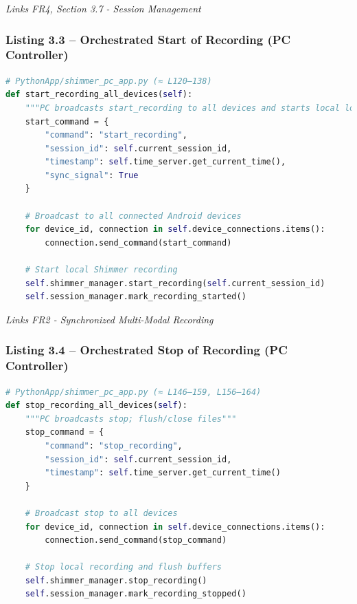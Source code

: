 \documentclass[12pt,a4paper]{article}
\begin{document}
\emph{Links FR4, Section 3.7 - Session Management}

\subsubsection{Listing 3.3 -- Orchestrated Start of Recording (PC Controller)}\label{listing-3.3-orchestrated-start-of-recording-pc-controller}

\begin{lstlisting}[language=Python]
# PythonApp/shimmer_pc_app.py (≈ L120–138)
def start_recording_all_devices(self):
    """PC broadcasts start_recording to all devices and starts local logging"""
    start_command = {
        "command": "start_recording",
        "session_id": self.current_session_id,
        "timestamp": self.time_server.get_current_time(),
        "sync_signal": True
    }
    
    # Broadcast to all connected Android devices
    for device_id, connection in self.device_connections.items():
        connection.send_command(start_command)
    
    # Start local Shimmer recording
    self.shimmer_manager.start_recording(self.current_session_id)
    self.session_manager.mark_recording_started()
\end{lstlisting}

\emph{Links FR2 - Synchronized Multi-Modal Recording}

\subsubsection{Listing 3.4 -- Orchestrated Stop of Recording (PC Controller)}\label{listing-3.4-orchestrated-stop-of-recording-pc-controller}

\begin{lstlisting}[language=Python]
# PythonApp/shimmer_pc_app.py (≈ L146–159, L156–164)
def stop_recording_all_devices(self):
    """PC broadcasts stop; flush/close files"""
    stop_command = {
        "command": "stop_recording",
        "session_id": self.current_session_id,
        "timestamp": self.time_server.get_current_time()
    }
    
    # Broadcast stop to all devices
    for device_id, connection in self.device_connections.items():
        connection.send_command(stop_command)
    
    # Stop local recording and flush buffers
    self.shimmer_manager.stop_recording()
    self.session_manager.mark_recording_stopped()
\end{lstlisting}
\end{document}
